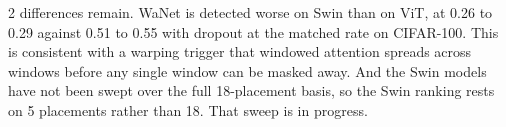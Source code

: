 2 differences remain. WaNet is detected worse on Swin than on ViT, at 0.26 to 0.29 against 0.51 to 0.55 with dropout at the matched rate on CIFAR-100. This is consistent with a warping trigger that windowed attention spreads across windows before any single window can be masked away. And the Swin models have not been swept over the full 18-placement basis, so the Swin ranking rests on 5 placements rather than 18. That sweep is in progress.
